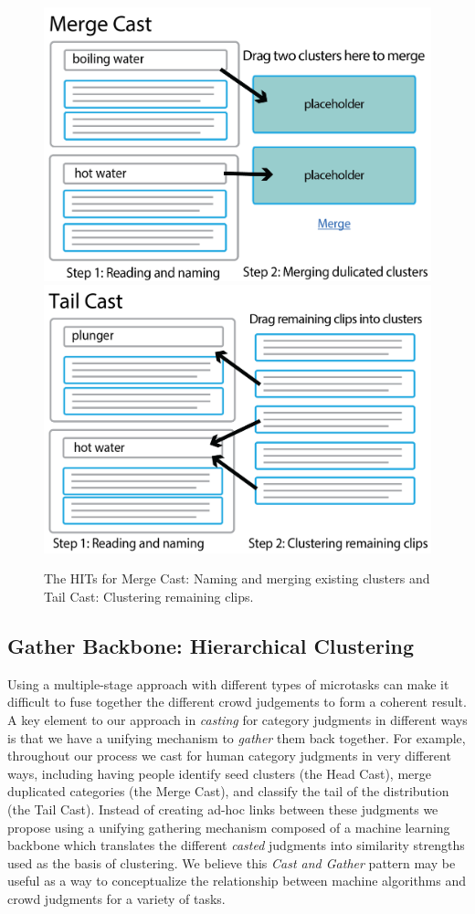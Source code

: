 \begin{figure}
	\centering
	\includegraphics[width=0.47\columnwidth]{Chapters/Alloy/images/clusteringv2-02.png}
	\includegraphics[width=0.47\columnwidth]{Chapters/Alloy/images/clusteringv2-03.png}
	\caption[HIT interface for the Merge Cast and the Tail Cast.]
        {The HITs for Merge Cast: Naming and merging existing
		clusters and Tail Cast: Clustering remaining clips.}
	\label{fig:phase2-hit}
\end{figure}

\subsection{Gather Backbone: Hierarchical Clustering}

\label{sec:hclustering}


Using a multiple-stage approach with different types of microtasks can make it
difficult to fuse together the different crowd judgements to form a coherent
result.  A key element to our approach in \textit{casting} for category
judgments in different ways is that we have a unifying mechanism to
\textit{gather} them back together.  For example, throughout our process we
cast for human category judgments in very different ways, including having
people identify seed clusters (the Head Cast), merge duplicated categories (the
Merge Cast), and classify the tail of the distribution (the Tail Cast).
Instead of creating ad-hoc links between these judgments we propose using a
unifying gathering mechanism composed of a machine learning backbone
which translates the different
\textit{casted} judgments into similarity strengths used as the basis of
clustering. We believe this \textit{Cast and Gather} pattern may be useful as
a way to conceptualize the relationship between machine algorithms and crowd
judgments for a variety of tasks.

